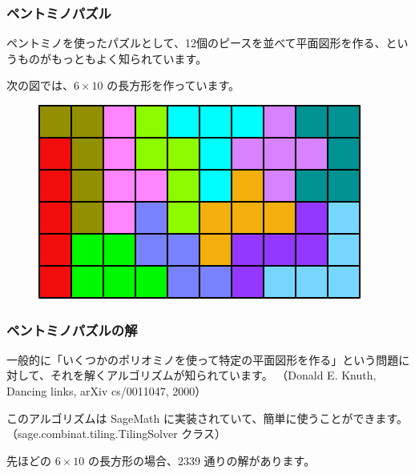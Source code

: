 \documentclass{beamer}
\begin{document}
\begin{frame}
    \frametitle{ペントミノパズル}

    ペントミノを使ったパズルとして、12個のピースを並べて平面図形を作る、というものがもっともよく知られています。

    次の図では、\(6 \times 10\) の長方形を作っています。

    \begin{figure}
        \includegraphics[scale=0.3]{images/PentominoTiling.png}
    \end{figure}
\end{frame}

\begin{frame}
    \frametitle{ペントミノパズルの解}

    一般的に「いくつかのポリオミノを使って特定の平面図形を作る」という問題に対して、それを解くアルゴリズムが知られています。
    （Donald E. Knuth, Dancing links, arXiv cs/0011047, 2000）

    \bigskip

    このアルゴリズムは SageMath に実装されていて、簡単に使うことができます。
    （sage.combinat.tiling.TilingSolver クラス）

    \bigskip

    先ほどの \(6 \times 10\) の長方形の場合、2339 通りの解があります。
\end{frame}
\end{document}

